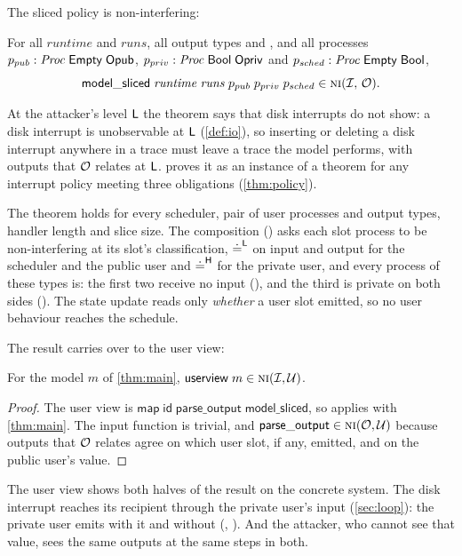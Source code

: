 The sliced policy is non-interfering:

\begin{theorem}\label{thm:main}
For all $\mathit{runtime}$ and $\mathit{runs}$, all output types  and
, and all processes $p_{pub} : \mathit{Proc}\;\mathsf{Empty}\;\mathsf{Opub}$,
$p_{priv} : \mathit{Proc}\;\mathsf{Bool}\;\mathsf{Opriv}$ and
$p_{sched} : \mathit{Proc}\;\mathsf{Empty}\;\mathsf{Bool}$,
\[
\mathsf{model\_sliced}\;\mathit{runtime}\;\mathit{runs}\;p_{pub}\;p_{priv}\;p_{sched}
  \in \text{\normalfont\scshape ni}(\mathcal{I},\, \mathcal{O}).
\]
\end{theorem}

At the attacker's level $\mathsf{L}$ the theorem says that disk interrupts do not show: a
disk interrupt is unobservable at $\mathsf{L}$ (\cref{def:io}), so inserting or deleting a
disk interrupt anywhere in a trace must leave a trace the model performs, with outputs
that $\mathcal{O}$ relates at $\mathsf{L}$.
 proves it as an instance of a theorem for any interrupt policy
meeting three obligations (\cref{thm:policy}).

The theorem holds for every scheduler, pair of user processes and output types,
handler length and slice size. The composition () asks each slot
process to be non-interfering at its slot's classification, ${\doteq^{\mathsf{L}}}$ on input and
output for the scheduler and the public user and ${\doteq^{\mathsf{H}}}$ for the private user, and
every process of these types is: the first two receive no input
(), and the third is private on both sides
(). The state update reads only \emph{whether} a user slot
emitted, so no user behaviour reaches the schedule.

The result carries over to the user view:

\begin{corollary}\label{cor:userview}
For the model $m$ of \cref{thm:main}, $\mathsf{userview}\;m \in \text{\normalfont\scshape ni}(\mathcal{I},\mathcal{U})$.
\end{corollary}

\begin{proof}
The user view is $\mathsf{map}\;\mathsf{id}\;\mathsf{parse\_output}\;\mathsf{model\_sliced}$,
so  applies with \cref{thm:main}. The input function  is trivial, and
$\mathsf{parse\_output} \in \text{\normalfont\scshape ni}(\mathcal{O},\mathcal{U})$ because outputs that $\mathcal{O}$ relates
agree on which user slot, if any, emitted, and on the public user's value.
\end{proof}

The user view shows both halves of the result on the concrete system. The disk
interrupt reaches its recipient through the private user's input (\cref{sec:loop}):
the private user emits  with it and  without (,
). And the attacker, who cannot see that value, sees the same outputs
at the same steps in both.
